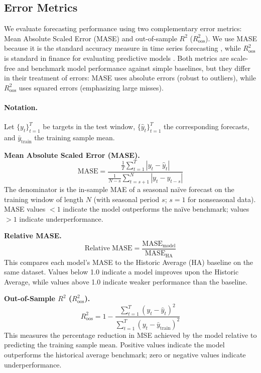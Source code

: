 \documentclass{article}
\begin{document}
\subsection{Error Metrics}\label{subsec:error_metrics}
We evaluate forecasting performance using two complementary error metrics: Mean Absolute Scaled Error (MASE) and out-of-sample $R^2$ ($R^2_{\text{oos}}$). We use MASE because it is the standard accuracy measure in time series forecasting \citep{Hyndman2006}, while $R^2_{\text{oos}}$ is standard in finance for evaluating predictive models \citep{Campbell2008}. Both metrics are scale-free and benchmark model performance against simple baselines, but they differ in their treatment of errors: MASE uses absolute errors (robust to outliers), while $R^2_{\text{oos}}$ uses squared errors (emphasizing large misses).

\paragraph{Notation.} Let $\{y_t\}_{t=1}^T$ be targets in the test window, $\{\hat y_t\}_{t=1}^T$ the corresponding forecasts, and $\bar{y}_{\text{train}}$ the training sample mean.

\medskip
\noindent\textbf{Mean Absolute Scaled Error (MASE).}
\[
\mathrm{MASE}=\frac{\frac{1}{T}\sum_{t=1}^T |y_t-\hat y_t|}
{\displaystyle \frac{1}{N-s}\sum_{t=s+1}^{N} |y_t - y_{t-s}|}
\]
The denominator is the in-sample MAE of a seasonal naïve forecast on the training window of length $N$ (with seasonal period $s$; $s{=}1$ for nonseasonal data). MASE values $<1$ indicate the model outperforms the naïve benchmark; values $>1$ indicate underperformance.

\medskip
\noindent\textbf{Relative MASE.}
\[
\mathrm{Relative\;MASE}=\frac{\mathrm{MASE}_{\text{model}}}{\mathrm{MASE}_{\text{HA}}}
\]
This compares each model's MASE to the Historic Average (HA) baseline on the same dataset. Values below 1.0 indicate a model improves upon the Historic Average, while values above 1.0 indicate weaker performance than the baseline.

\medskip
\noindent\textbf{Out-of-Sample $R^2$ ($R^2_{\text{oos}}$).}
\[
R^2_{\text{oos}} = 1 - \frac{\sum_{t=1}^T (y_t-\hat y_t)^2}{\sum_{t=1}^T (y_t-\bar{y}_{\text{train}})^2}
\]
This measures the percentage reduction in MSE achieved by the model relative to predicting the training sample mean. Positive values indicate the model outperforms the historical average benchmark; zero or negative values indicate underperformance.
\end{document}

